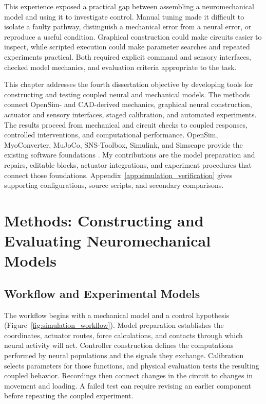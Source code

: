 This experience exposed a practical gap between assembling a neuromechanical model and using it to investigate control. Manual tuning made it difficult to isolate a faulty pathway, distinguish a mechanical error from a neural error, or reproduce a useful condition. Graphical construction could make circuits easier to inspect, while scripted execution could make parameter searches and repeated experiments practical. Both required explicit command and sensory interfaces, checked model mechanics, and evaluation criteria appropriate to the task.

This chapter addresses the fourth dissertation objective by developing tools for constructing and testing coupled neural and mechanical models. The methods connect OpenSim- and CAD-derived mechanics, graphical neural construction, actuator and sensory interfaces, staged calibration, and automated experiments. The results proceed from mechanical and circuit checks to coupled responses, controlled interventions, and computational performance. OpenSim, MyoConverter, MuJoCo, SNS-Toolbox, Simulink, and Simscape provide the existing software foundations \citep{delp_opensim_2007,caggiano_myosuite_2022,todorov_mujoco_2012,nourse_sns_2023}. My contributions are the model preparation and repairs, editable blocks, actuator integrations, and experiment procedures that connect those foundations. Appendix~\ref{app:simulation_verification} gives supporting configurations, source scripts, and secondary comparisons.

\section{Methods: Constructing and Evaluating Neuromechanical Models}\label{sec:preliminary_sim_methods}

\subsection{Workflow and Experimental Models}\label{sec:sns_existing_tools}\label{sec:sns_gait_comparison_main}

The workflow begins with a mechanical model and a control hypothesis (Figure~\ref{fig:simulation_workflow}). Model preparation establishes the coordinates, actuator routes, force calculations, and contacts through which neural activity will act. Controller construction defines the computations performed by neural populations and the signals they exchange. Calibration selects parameters for those functions, and physical evaluation tests the resulting coupled behavior. Recordings then connect changes in the circuit to changes in movement and loading. A failed test can require revising an earlier component before repeating the coupled experiment.

